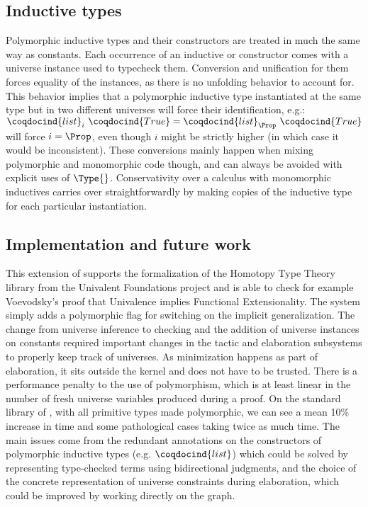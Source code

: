 \subsection{Inductive types}
\label{sec:inductive-types}

Polymorphic inductive types and their constructors are treated in much
the same way as constants. Each occurrence of an inductive or
constructor comes with a universe instance used to typecheck them.
Conversion and unification for them forces equality of the instances, as
there is no unfolding behavior to account for. This behavior implies
that a polymorphic inductive type instantiated at the same type but in
two different universes will force their identification, e.g.:
$\coqdocind{list}_{i}~\coqdocind{True} =
\coqdocind{list}_{\Prop}~\coqdocind{True}$ will force $i = \Prop$, even
though $i$ might be strictly higher (in which case it would be
inconsistent). These conversions mainly happen when mixing polymorphic
and monomorphic code though, and can always be avoided with explicit uses
of $\Type{}$. Conservativity over a calculus with monomorphic
inductives carries over straightforwardly by making copies of the
inductive type for each particular instantiation.

\subsection{Implementation and future work}
\label{sec:poly-impl}

This extension of \Coq
supports the formalization of the Homotopy Type Theory library from the
Univalent Foundations project and is able to check for example
Voevodsky's proof that Univalence implies Functional Extensionality.
The system simply adds a polymorphic flag for switching on the implicit
generalization. The change from universe inference to checking and the
addition of universe instances on constants required important changes
in the tactic and elaboration subsystems to properly keep track of
universes. As minimization happens as part of elaboration, it sits
outside the kernel and does not have to be trusted. There is a
performance penalty to the use of polymorphism, which is at least linear
in the number of fresh universe variables produced during a proof. On
the standard library of \Coq, with all primitive types made polymorphic,
we can see a mean 10\% increase in time and some pathological cases
taking twice as much time. The main issues come from the redundant
annotations on the constructors of polymorphic inductive types
(e.g. $\coqdocind{list}$) which could be solved by representing
type-checked terms using bidirectional judgments, and the choice of the
concrete representation of universe constraints during elaboration,
which could be improved by working directly on the graph.

